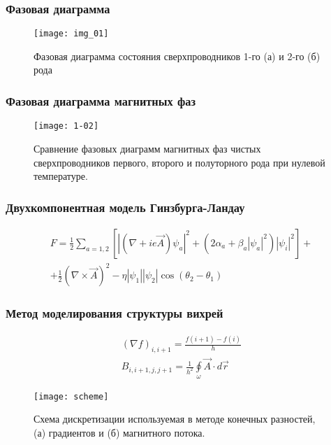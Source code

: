 \begin{frame}
    \frametitle{Фазовая диаграмма}
    \begin{figure}[h]
        \center
        \texttt{[image: img\_01]}
        \caption{Фазовая диаграмма состояния сверхпроводников 1-го (а) и 
            2-го (б) рода}
    \end{figure}
\end{frame}

\begin{frame}
    \frametitle{Фазовая диаграмма магнитных фаз}
    \begin{figure}[h]
        \center
        \texttt{[image: 1-02]}
        \caption{Сравнение фазовых диаграмм магнитных фаз чистых 
            сверхпроводников первого, второго и полуторного рода при нулевой 
            температуре.}
    \end{figure}
\end{frame}

\begin{frame}
    \frametitle{Двухкомпонентная модель Гинзбурга-Ландау}
    \begin{gather}
        F = \frac{1}{2}\sum\limits_{a=1,2}\left[ 
            \left|\left( \nabla + ie\vec{A}\right)\psi_a\right|^2 + 
            \left( 2\alpha_a + \beta_a |\psi_a|^2 \right)|\psi_i|^2 \right] 
            + \nonumber \\ + \frac{1}{2}\left( \nabla\times\vec{A} \right)^2 - 
            \eta|\psi_1||\psi_2|\cos(\theta_2-\theta_1)
    \end{gather}
\end{frame}

\begin{frame}
    \frametitle{Метод моделирования структуры вихрей}
    \begin{gather}
        \left( \nabla f \right)_{i,i+1} = \frac{f(i+1)-f(i)}{h} \\
        B_{i,i+1,j,j+1} = \frac{1}{h^2}\oint\limits_{\omega} 
            \vec{A} \cdot d\vec{r}
    \end{gather}
    \begin{figure}[h]
        \center
        \texttt{[image: scheme]}
        \caption{Схема дискретизации используемая в методе конечных разностей, 
            (а) градиентов и (б) магнитного потока.}
    \end{figure}
\end{frame}


